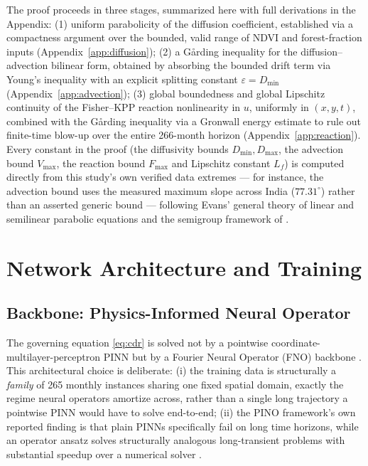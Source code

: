 \documentclass[journal]{IEEEtran}
\begin{document}
The proof proceeds in three stages, summarized here with full derivations in the Appendix: (1) uniform parabolicity of the diffusion coefficient, established via a compactness argument over the bounded, valid range of NDVI and forest-fraction inputs (Appendix~\ref{app:diffusion}); (2) a Gårding inequality for the diffusion--advection bilinear form, obtained by absorbing the bounded drift term via Young's inequality with an explicit splitting constant $\varepsilon=D_{\min}$ (Appendix~\ref{app:advection}); (3) global boundedness and global Lipschitz continuity of the Fisher--KPP reaction nonlinearity in $u$, uniformly in $(x,y,t)$, combined with the Gårding inequality via a Gronwall energy estimate to rule out finite-time blow-up over the entire 266-month horizon (Appendix~\ref{app:reaction}). Every constant in the proof (the diffusivity bounds $D_{\min},D_{\max}$, the advection bound $V_{\max}$, the reaction bound $F_{\max}$ and Lipschitz constant $L_f$) is computed directly from this study's own verified data extremes --- for instance, the advection bound uses the measured maximum slope across India ($77.31^{\circ}$) rather than an asserted generic bound --- following Evans' general theory of linear and semilinear parabolic equations \cite{evans2010} and the semigroup framework of \cite{pazy1983}.


\section{Network Architecture and Training}
\label{sec:architecture}

\subsection{Backbone: Physics-Informed Neural Operator}

The governing equation \eqref{eq:cdr} is solved not by a pointwise coordinate-multilayer-perceptron PINN \cite{raissi2019} but by a Fourier Neural Operator (FNO) backbone \cite{li2021fno,li2023pino}. This architectural choice is deliberate: (i) the training data is structurally a \emph{family} of 265 monthly instances sharing one fixed spatial domain, exactly the regime neural operators amortize across, rather than a single long trajectory a pointwise PINN would have to solve end-to-end; (ii) the PINO framework's own reported finding is that plain PINNs specifically fail on long time horizons, while an operator ansatz solves structurally analogous long-transient problems with substantial speedup over a numerical solver \cite{li2023pino}.
\end{document}
